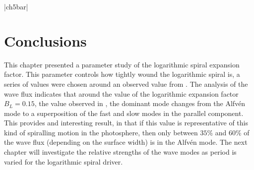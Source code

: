 \py[chapter5]|ch5bar|


\section{Conclusions}

This chapter presented a parameter study of the logarithmic spiral expansion factor.
This parameter controls how tightly wound the logarithmic spiral is, a series of values were chosen around an observed value from \cite{bonet2008}.
The analysis of the wave flux indicates that around the value of the logarithmic expansion factor $B_L=0.15$, the value observed in \cite{bonet2008}, the dominant mode changes from the Alfv\'en mode to a superposition of the fast and slow modes in the parallel component.
This provides and interesting result, in that if this value is representative of this kind of spiralling motion in the photosphere, then only between $35$\% and $60$\% of the wave flux (depending on the surface width) is in the Alfv\'en mode.
The next chapter will investigate the relative strengths of the wave modes as period is varied for the logarithmic spiral driver.

